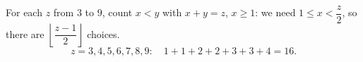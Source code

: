 For each $z$ from $3$ to $9$, count $x<y$ with $x+y=z$, $x\ge1$: we need $1\le x<\dfrac {z}{2}$, so there are $\left\lfloor\dfrac{z-1}{2}\right\rfloor$ choices.
\[
z=3,4,5,6,7,8,9:\quad 1+1+2+2+3+3+4=\boxed{16}.
\]
